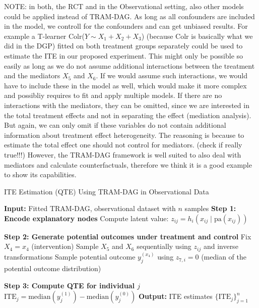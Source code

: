 NOTE: in both, the RCT and in the Observational setting, also other models could be applied instead of TRAM-DAG. As long as all confounders are included in the model, we controll for the confounders and can get unbiased results. For example a T-learner Colr($Y \sim X_1 + X_2 + X_3$) (because Colr is basically what we did in the DGP) fitted on both treatment groups separately could be used to estimate the ITE in our proposed experiment. This might only be possible so easily as long as we do not assume additional interactions between the treatment and the mediators $X_5$ and $X_6$. If we would assume such interactions, we would have to include these in the model as well, which would make it more complex and possibliy requires to fit and apply multiple models. If there are no interactions with the mediators, they can be omitted, since we are interested in the total treatment effects and not in separating the effect (mediation analysis). But again, we can only omit if these variables do not contain additional information about treatment effect heterogeneity. The reasoning is because to estimate the total effect one should not control for mediators. (check if really true!!!)  However, the TRAM-DAG framework is well suited to also deal with mediators and calculate counterfactuals, therefore we think it is a good example to show its capabilities.


\begin{algorithm}
\caption{ITE Estimation (QTE) Using TRAM-DAG in Observational Data}
\label{alg:ite_qte}
\begin{algorithmic}[1]
\State \textbf{Input:} Fitted TRAM-DAG, observational dataset with $n$ samples
  \State \textbf{Step 1: Encode explanatory nodes}
    \State Compute latent value: $z_{ij} = h_i(x_{ij} \mid \text{pa}(x_{ij}))$
  \EndFor

  \State \textbf{Step 2: Generate potential outcomes under treatment and control}
   
    \State Fix $X_4 = x_4$ (intervention)
    \State Sample $X_5$ and $X_6$ sequentially using $z_{ij}$ and inverse transformations
    \State Sample potential outcome $y_j^{(x_4)}$ using $z_{7,i} = 0$ (median of the potential outcome distribution)

  \EndFor

  \State \textbf{Step 3: Compute QTE for individual $j$}
  \State $\text{ITE}_j = \text{median}(y_j^{(1)}) - \text{median}(y_j^{(0)})$
\EndFor
\State \textbf{Output:} ITE estimates $\{\text{ITE}_j\}_{j=1}^n$
\end{algorithmic}
\end{algorithm}





